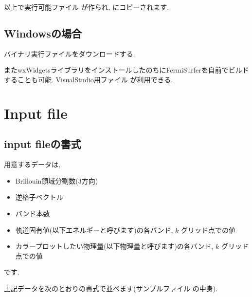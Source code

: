 \documentclass[letterpaper,10pt,dvipdfmx,openany]{sphinxmanual}
\begin{document}
\sphinxAtStartPar
以上で実行可能ファイル  が作られ,
 にコピーされます.


\section{Windowsの場合}
\label{\detokenize{install:windows}}
\sphinxAtStartPar
バイナリ実行ファイルをダウンロードする.

\sphinxAtStartPar
またwxWidgetsライブラリをインストールしたのちにFermiSurferを自前でビルドすることも可能.
VisualStudio用ファイル  が利用できる.

\sphinxstepscope


\chapter{Input file}
\label{\detokenize{input:input-file}}\label{\detokenize{input:input}}\label{\detokenize{input::doc}}

\section{input fileの書式}
\label{\detokenize{input:id1}}
\sphinxAtStartPar
用意するデータは,
\begin{itemize}
\item {} 
\sphinxAtStartPar
Brillouin領域分割数(3方向)

\item {} 
\sphinxAtStartPar
逆格子ベクトル

\item {} 
\sphinxAtStartPar
バンド本数

\item {} 
\sphinxAtStartPar
軌道固有値(以下エネルギーと呼びます)の各バンド,  \(k\) グリッド点での値

\item {} 
\sphinxAtStartPar
カラープロットしたい物理量(以下物理量と呼びます)の各バンド,
\(k\) グリッド点での値

\end{itemize}

\sphinxAtStartPar
です.

\sphinxAtStartPar
上記データを次のとおりの書式で並べます(サンプルファイル
 の中身).
\end{document}
